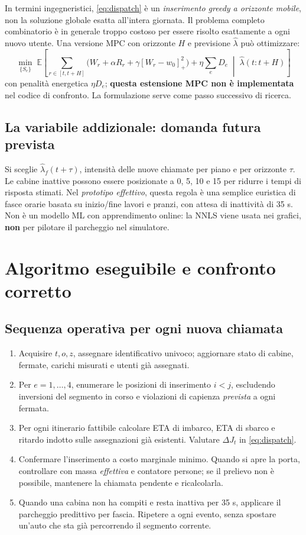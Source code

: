 \documentclass[11pt,a4paper]{article}
\newcommand{\pos}[1]{\left[#1\right]_+}
\newcommand{\secname}[1]{\vspace{1mm}\section{#1}}
\begin{document}
In termini ingegneristici, \eqref{eq:dispatch} \`e un \emph{inserimento greedy a orizzonte mobile}, non la soluzione globale esatta all'intera giornata. Il problema completo combinatorio \`e in generale troppo costoso per essere risolto esattamente a ogni nuovo utente. Una versione MPC con orizzonte \(H\) e previsione \(\widehat\lambda\) pu\`o ottimizzare:
\begin{equation}
\min_{\{S_e\}}\;\mathbb E\!\left[\sum_{r\in[t,t+H]}
\bigl(W_r+\alpha R_r+\gamma\pos{W_r-w_0}^2\bigr)
+\eta\sum_e D_e\;\middle|\;\widehat\lambda(t:t+H)\right]
\end{equation}
con penalit\`a energetica \(\eta D_e\); \textbf{questa estensione MPC non \`e implementata} nel codice di confronto. La formulazione serve come passo successivo di ricerca.

\subsection{La variabile addizionale: domanda futura prevista}
Si sceglie \(\widehat\lambda_f(t+\tau)\), intensit\`a delle nuove chiamate per piano e per orizzonte \(\tau\). Le cabine inattive possono essere posizionate a 0, 5, 10 e 15 per ridurre i tempi di risposta stimati. Nel \emph{prototipo effettivo}, questa regola \`e una semplice euristica di fasce orarie basata su inizio/fine lavori e pranzi, con attesa di inattivit\`a di 35 s. Non \`e un modello ML con apprendimento online: la NNLS viene usata nei grafici, \textbf{non} per pilotare il parcheggio nel simulatore.
\newpage
\secname{Algoritmo eseguibile e confronto corretto}
\subsection{Sequenza operativa per ogni nuova chiamata}
\begin{enumerate}[leftmargin=7mm]
\item Acquisire \(t,o,z\), assegnare identificativo univoco; aggiornare stato di cabine, fermate, carichi misurati e utenti gi\`a assegnati.
\item Per \(e=1,\ldots,4\), enumerare le posizioni di inserimento \(i<j\), escludendo inversioni del segmento in corso e violazioni di capienza \emph{prevista} a ogni fermata.
\item Per ogni itinerario fattibile calcolare ETA di imbarco, ETA di sbarco e ritardo indotto sulle assegnazioni gi\`a esistenti. Valutare \(\Delta J_t\) in \eqref{eq:dispatch}.
\item Confermare l'inserimento a costo marginale minimo. Quando si apre la porta, controllare con massa \emph{effettiva} e contatore persone; se il prelievo non \`e possibile, mantenere la chiamata pendente e ricalcolarla.
\item Quando una cabina non ha compiti e resta inattiva per 35 s, applicare il parcheggio predittivo per fascia. Ripetere a ogni evento, senza spostare un'auto che sta gi\`a percorrendo il segmento corrente.
\end{enumerate}
\end{document}
